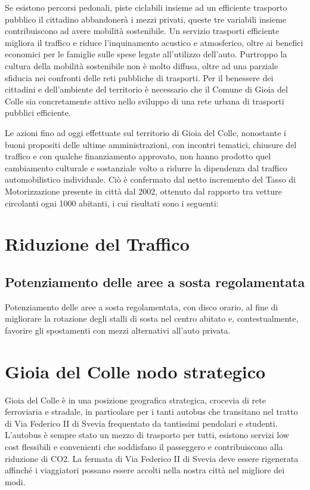 \documentclass[a4paper,14pt,italian]{sphinxmanual}
\begin{document}

Se esistono percorsi pedonali, piste ciclabili insieme ad un efficiente trasporto pubblico il cittadino abbandonerà i mezzi privati, queste tre variabili insieme contribuiscono ad avere mobilità sostenibile.
Un servizio trasporti efficiente migliora il traffico e riduce l’inquinamento acustico e atmosferico, oltre ai benefici economici per le famiglie sulle spese legate all’utilizzo dell’auto. Purtroppo la cultura della mobilità sostenibile non è molto diffusa, oltre ad una parziale sfiducia nei confronti delle reti pubbliche di trasporti.
Per il benessere dei cittadini e dell’ambiente del territorio è necessario che il Comune di Gioia del Colle sia concretamente attivo nello sviluppo di una rete urbana di trasporti pubblici efficiente.

Le azioni fino ad oggi effettuate sul territorio di Gioia del Colle, nonostante i buoni propositi delle ultime amministrazioni, con incontri tematici, chiusure del traffico e con qualche finanziamento approvato, non hanno prodotto quel cambiamento culturale e sostanziale volto a ridurre la dipendenza dal traffico automobilistico individuale. Ciò è confermato dal netto incremento del Tasso di Motorizzazione presente in città dal 2002, ottenuto dal rapporto tra vetture circolanti ogni 1000 abitanti, i cui risultati sono i seguenti:


\section{Riduzione del Traffico}
\label{\detokenize{mobilita:riduzione-del-traffico}}

\subsection{Potenziamento delle aree a sosta regolamentata}
\label{\detokenize{mobilita:potenziamento-delle-aree-a-sosta-regolamentata}}
Potenziamento delle aree a sosta regolamentata, con disco orario, al fine di migliorare la rotazione degli stalli di sosta nel centro abitato e, contestualmente, favorire gli spostamenti con mezzi alternativi all’auto privata.


\section{Gioia del Colle nodo strategico}
\label{\detokenize{mobilita:gioia-del-colle-nodo-strategico}}
Gioia del Colle è in una posizione geografica strategica, crocevia di rete ferroviaria e stradale, in particolare per i tanti autobus che transitano nel tratto di Via Federico II di Svevia frequentato da tantissimi pendolari e studenti.
L’autobus è sempre stato un mezzo di trasporto per tutti, esistono servizi low cost flessibili e convenienti che soddisfano il passeggero e contribuiscono alla riduzione di CO2.
La fermata di Via Federico II di Svevia deve essere rigenerata affinché i viaggiatori possano essere accolti nella nostra città nel migliore dei modi.
\end{document}
